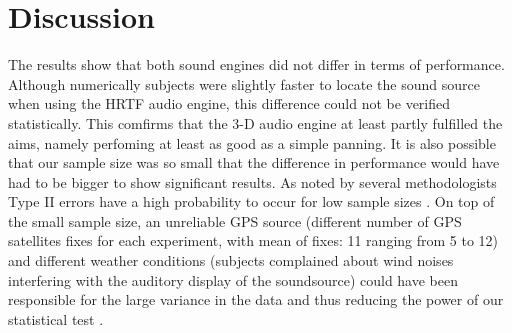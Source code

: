 \documentclass[journal]{IEEEtran}
\begin{document}
\begin{table}[h]
  \caption{Overall results}
\label{table:overallquestionaire}
\end{table}

\section{Discussion}
The results show that both sound engines did not differ in terms of performance. Although numerically subjects were slightly faster to locate the sound source when using the HRTF audio engine, this difference could not be verified statistically. This comfirms that the 3-D audio engine at least partly fulfilled the aims, namely perfoming at least as good as a simple panning. It is also possible that our sample size was so small that the difference in performance would have had to be bigger to show significant results. As noted by several methodologists Type II errors have a high probability to occur for low sample sizes \cite{DeWinter2013}. On top of the small sample size, an unreliable GPS source (different number of GPS satellites fixes for each experiment, with mean of fixes: 11 ranging from 5 to 12) and different weather conditions (subjects complained about wind noises interfering with the auditory display of the soundsource) could have been responsible for the large variance in the data and thus reducing the power of our statistical test \cite{McClelland2000}.
\end{document}
